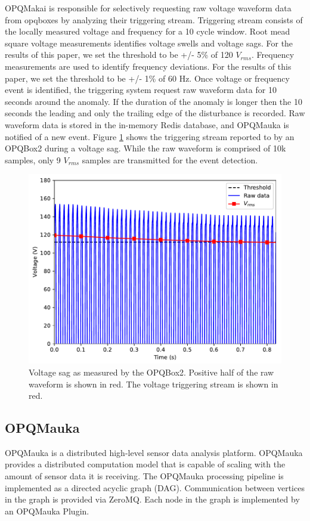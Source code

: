 \documentclass[a4paper, conference]{IEEEtran}
\begin{document}
OPQMakai is responsible for selectively requesting raw voltage waveform data from opqboxes by analyzing their triggering stream. Triggering stream consists of the locally measured voltage and frequency for a 10 cycle window. Root mead square voltage measurements identifies voltage swells and voltage sags. For the results of this paper, we set the threshold to be +/- 5\% of 120 $V_{rms}$. 
Frequency measurements are used to identify frequency deviations. For the results of this paper, we set the threshold to be +/- 1\% of 60 Hz. Once voltage or frequency event is identified, the triggering system request raw waveform data for 10 seconds around the anomaly. If the duration of the anomaly is longer then the 10 seconds the leading and only the trailing edge of the disturbance is recorded. Raw waveform data is stored in the in-memory Redis database, and OPQMauka is notified of a new event.
Figure \ref{fig:event1} shows the triggering stream reported to by an OPQBox2 during a voltage sag. While the raw waveform is comprised of 10k samples, only 9 $V_{rms}$ samples are transmitted for the event detection.

\begin{figure}[h]
    \centering
    \includegraphics[width=0.9\columnwidth]{img/single_device_sag.pdf}
    \caption{Voltage sag as measured by the OPQBox2. Positive half of the raw waveform is shown in red. The voltage triggering stream is shown in red.}
    \label{fig:event1}
\end{figure}

\subsection{OPQMauka}
OPQMauka is a distributed high-level sensor data analysis platform. OPQMauka provides a distributed computation model that is capable of scaling with the amount of sensor data it is receiving. The OPQMauka processing pipeline is implemented as a directed acyclic graph (DAG). Communication between vertices in the graph is provided via ZeroMQ. Each node in the graph is implemented by an OPQMauka Plugin. 
\end{document}

